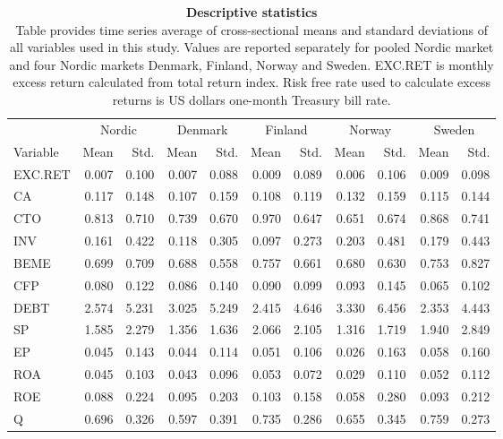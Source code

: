 \documentclass{article}
\begin{document}
\begin{table}[ht] 
\small
\caption[Descriptive statistics]{\textbf{Descriptive statistics}\\ Table provides time series average of cross-sectional means and standard deviations of all variables used in this study. Values are reported separately for pooled Nordic market and four Nordic markets Denmark, Finland, Norway and Sweden. EXC.RET is monthly excess return calculated from total return index. Risk free rate used to calculate excess returns is US dollars one-month Treasury bill rate.}
 \label{table:descriptive}
\centering
\begin{tabularx}{\textwidth}{@{\extracolsep{1pt}} X r r r r r r r r r r} 
\toprule
 & \multicolumn{2}{c}{Nordic} & \multicolumn{2}{c}{Denmark} & \multicolumn{2}{c}{Finland} & \multicolumn{2}{c}{Norway}&\multicolumn{2}{c}{Sweden} \\
\cline{2-3}\cline{4-5}\cline{6-7}\cline{8-9}\cline{10-11}
Variable 		& Mean 	& Std. 	& Mean 	& Std. 	& Mean 	& Std. 	& Mean 	& Std. 	& Mean 	& Std. \\
\midrule
EXC.RET		& 0.007 	& 0.100	& 0.007 	& 0.088	& 0.009	& 0.089	& 0.006	& 0.106	& 0.009	& 0.098 \\
CA		 	& 0.117 	& 0.148	& 0.107 	& 0.159	& 0.108	& 0.119	& 0.132	& 0.159	& 0.115	& 0.144 \\
CTO		 	& 0.813  	& 0.710 	& 0.739 	& 0.670	& 0.970	& 0.647	& 0.651	& 0.674	& 0.868	& 0.741 \\
INV 			& 0.161 	& 0.422	& 0.118 	& 0.305	& 0.097	& 0.273	& 0.203	& 0.481	& 0.179	& 0.443 \\
BEME	 	& 0.699 	& 0.709	& 0.688 	& 0.558	& 0.757	& 0.661	& 0.680	& 0.630	& 0.753	& 0.827 \\
CFP	 		& 0.080 	& 0.122	& 0.086 	& 0.140	& 0.090	& 0.099	& 0.093	& 0.145	& 0.065	& 0.102 \\
DEBT	 	& 2.574 	& 5.231	& 3.025 	& 5.249	& 2.415	& 4.646	& 3.330	& 6.456	& 2.353	& 4.443 \\
SP 			& 1.585	& 2.279	& 1.356 	& 1.636	& 2.066	& 2.105	& 1.316	& 1.719	& 1.940	& 2.849 \\
EP 			& 0.045	& 0.143	& 0.044 	& 0.114	& 0.051	& 0.106	& 0.026	& 0.163	& 0.058	& 0.160 \\
ROA 		& 0.045	& 0.103	& 0.043 	& 0.096	& 0.053	& 0.072	& 0.029	& 0.110	& 0.052	& 0.112 \\
ROE 		& 0.088 	& 0.224	& 0.095 	& 0.203	& 0.103	& 0.158	& 0.058	& 0.280	& 0.093	& 0.212 \\
Q			& 0.696 	& 0.326	& 0.597 	& 0.391	& 0.735	& 0.286	& 0.655	& 0.345	& 0.759 	& 0.273 \\

\end{tabularx}
\end{table}
\end{document}
